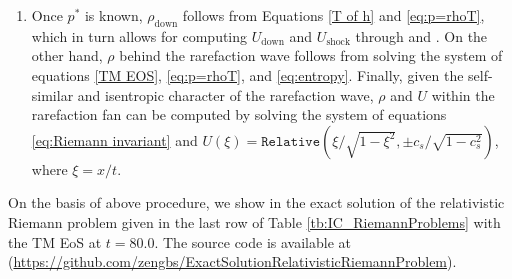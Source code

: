 \documentclass[twocolumn]{aastex63}
\begin{document}
\begin{enumerate}
    \item Once $p^{*}$ is known, $\rho_{\text{down}}$ follows from Equations \eqref{T of h} and \eqref{eq:p=rhoT}, which in turn allows for computing $U_{\text{down}}$ and $U_{\text{shock}}$ through  and . On the other hand, $\rho$ behind the rarefaction wave follows from solving the system of equations \eqref{TM EOS}, \eqref{eq:p=rhoT}, and \eqref{eq:entropy}. Finally, given the self-similar and isentropic character of the rarefaction wave, $\rho$ and $U$ within the rarefaction fan can be computed by solving the system of equations \eqref{eq:Riemann invariant} and $U(\xi)=\texttt{Relative}(\xi/\sqrt{1-\xi^2},\pm c_{s}/\sqrt{1-c_{s}^2})$, where $\xi=x/t$.
    \end{enumerate}

On the basis of above procedure, we show in  the exact solution of the relativistic Riemann problem given in the last row of Table \ref{tb:IC_RiemannProblems} with the TM EoS at $t=80.0$. The source code is available at (\url{https://github.com/zengbs/ExactSolutionRelativisticRiemannProblem}).
\end{document}
